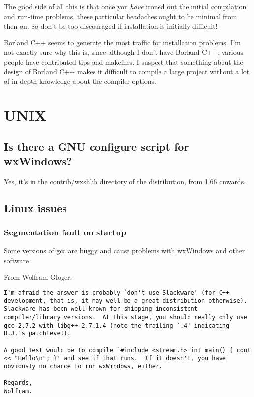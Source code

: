 The good side of all this is that once you {\it have} ironed out the initial compilation
and run-time problems, these particular headaches ought to be minimal from then on.
So don't be too discouraged if installation is initially difficult!

Borland C++ seems to generate the most traffic for installation problems. I'm
not exactly sure why this is, since although I don't have Borland C++, various
people have contributed tips and makefiles. I suspect that something about
the design of Borland C++ makes it difficult to compile a large project without a lot
of in-depth knowledge about the compiler options.

\section{UNIX}

\subsection{Is there a GNU configure script for wxWindows?}

Yes, it's in the contrib/wxshlib directory of the distribution, from 1.66 onwards.

\subsection{Linux issues}

\subsubsection{Segmentation fault on startup}

Some versions of gcc are buggy and cause problems with wxWindows and other software.

From Wolfram Gloger:

\begin{verbatim}
I'm afraid the answer is probably `don't use Slackware' (for C++
development, that is, it may well be a great distribution otherwise).
Slackware has been well known for shipping inconsistent
compiler/library versions.  At this stage, you should really only use
gcc-2.7.2 with libg++-2.7.1.4 (note the trailing `.4' indicating
H.J.'s patchlevel).

A good test would be to compile `#include <stream.h> int main() { cout
<< "Hello\n"; }' and see if that runs.  If it doesn't, you have
obviously no chance to run wxWindows, either.

Regards,
Wolfram.
\end{verbatim}

